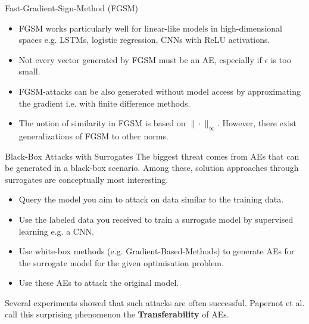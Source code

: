 \documentclass[11pt,compress,t,notes=noshow, xcolor=table]{beamer}
\begin{document}
\begin{vbframe}{Fast-Gradient-Sign-Method (FGSM)}
\begin{itemize}
    \item FGSM works particularly well for linear-like models in high-dimensional spaces e.g. LSTMs, logistic regression, CNNs with ReLU activations.
    \item Not every vector generated by FGSM must be an AE, especially if $\epsilon$ is too small.
    \item FGSM-attacks can be also generated without model access by approximating the gradient i.e. with finite difference methods.
    \item The notion of similarity in FGSM is based on $\|\cdot\|_{\infty}$. However, there exist generalizations of FGSM to other norms.
\end{itemize}
\end{vbframe}


\begin{vbframe}{Black-Box Attacks with Surrogates}
The biggest threat comes from AEs that can be generated in a black-box scenario. Among these, solution approaches through surrogates are conceptually most interesting.
\begin{itemize}
    \item Query the model you aim to attack on data similar to the training data.
    \item Use the labeled data you received to train a surrogate model by supervised learning e.g. a CNN.
    \item Use white-box methods (e.g. Gradient-Based-Methods) to generate AEs for the surrogate model for the given optimisation problem.
    \item Use these AEs to attack the original model.
\end{itemize}
Several experiments showed that such attacks are often successful. Papernot et al. call this surprising phenomenon the \textbf{Transferability} of AEs.
%
%
\end{vbframe}
\end{document}

